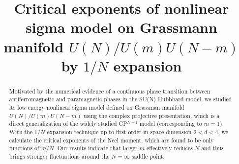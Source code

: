 \documentclass[aps,twocolumn,superscriptaddress]{revtex4-1}
\begin{document}
\title{Critical exponents of nonlinear sigma model on Grassmann manifold $U(N)/U(m)U(N-m)$ by $1/N$ expansion}
\begin{abstract}
  Motivated by the numerical evidence of a continuous phase transition between antiferromagnetic and paramagnetic phases
  in the SU(N) Hubbbard model, we studied its low energy nonlinear sigma model defined on Grassman manifold
  $U(N)/U(m)U(N-m)$ using the complex projective presentation, which is a direct generalization of the widely studied
  CP$^{N-1}$ model (corresponding to $m=1$). With the $1/N$ expansion technique up to first order in space dimension
  $2<d<4$, we calculate the critical exponents of the Neel moment, which are found to be only functions of $m/N$. Our
  results indicate that larger $m$ effectively reduces $N$ and thus brings stronger fluctuations around the $N=\infty$
  saddle point.
\end{abstract}
\maketitle

\end{document}
